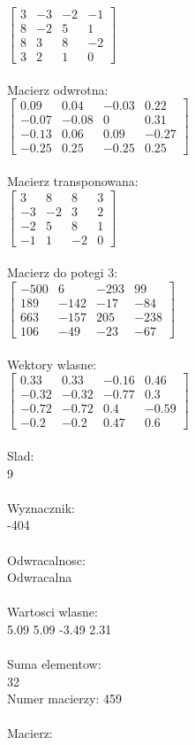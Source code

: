 \documentclass[a4paper,12pt]{article}
\begin{document}
$\begin{bmatrix} 3&-3&-2&-1\\8&-2&5&1\\8&3&8&-2\\3&2&1&0 \end{bmatrix}$
\\
\\
Macierz odwrotna:\\

$\begin{bmatrix} 0.09&0.04&-0.03&0.22\\-0.07&-0.08&0&0.31\\-0.13&0.06&0.09&-0.27\\-0.25&0.25&-0.25&0.25 \end{bmatrix}$
\\
\\
Macierz transponowana:\\

$\begin{bmatrix} 3&8&8&3\\-3&-2&3&2\\-2&5&8&1\\-1&1&-2&0 \end{bmatrix}$
\\
\\
Macierz do potegi 3:\\

$\begin{bmatrix} -500&6&-293&99\\189&-142&-17&-84\\663&-157&205&-238\\106&-49&-23&-67 \end{bmatrix}$
\\
\\
Wektory wlasne:\\

$\begin{bmatrix} 0.33&0.33&-0.16&0.46\\-0.32&-0.32&-0.77&0.3\\-0.72&-0.72&0.4&-0.59\\-0.2&-0.2&0.47&0.6 \end{bmatrix}$
\\
\\
Slad:\\
9
\\
\\
Wyznacznik:\\
-404
\\
\\
Odwracalnosc:\\
Odwracalna
\\
\\
Wartosci wlasne:\\
5.09 5.09 -3.49 2.31
\\
\\
Suma elementow:\\
32
\\
\newpage
Numer macierzy:
459
\\
\\
Macierz:\\
\end{document}
